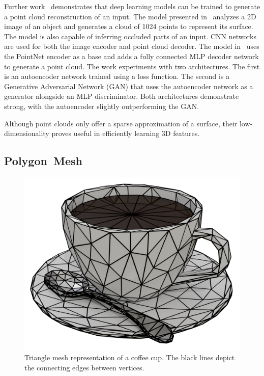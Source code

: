 Further work~\cite{Fan2017, Achlioptas2018} demonstrates that deep learning models can be trained to generate a point cloud reconstruction of an input. The model presented in~\cite{Fan2017} analyzes a 2D image of an object and generates a cloud of 1024 points to represent its surface. The model is also capable of inferring occluded parts of an input. CNN networks are used for both the image encoder and point cloud decoder. The model in~\cite{Achlioptas2018} uses the PointNet encoder as a base and adds a fully connected MLP decoder network to generate a point cloud. The work experiments with two architectures. The first is an autoencoder network trained using a loss function. The second is a Generative Adversarial Network (GAN) that uses the autoencoder network as a generator alongside an MLP discriminator. Both architectures demonstrate strong, with the autoencoder slightly outperforming the GAN.

Although point clouds only offer a sparse approximation of a surface, their low-dimensionality proves useful in efficiently learning 3D features.


\subsection{Polygon~Mesh}
\label{subsec:polygon_mesh}

\begin{figure}[ht]
	\centering
	\includegraphics[scale=0.2]{Images/Mesh Cup}
	\caption{Triangle mesh representation of a coffee cup. The black lines depict the connecting edges between vertices.}
	\label{fig:mesh_cup}
\end{figure}

